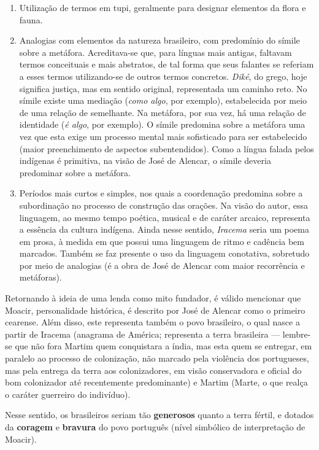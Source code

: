 \documentclass[12pt]{book}
\begin{document}
				\begin{enumerate}
					\item Utilização de termos em tupi, geralmente para designar elementos da flora e fauna.
					\item Analogias com elementos da natureza brasileiro, com predomínio do símile sobre a metáfora. Acreditava-se que, para línguas mais antigas, faltavam termos conceituais e mais abstratos, de tal forma que seus falantes se referiam a esses termos utilizando-se de outros termos concretos. \textit{Diké}, do grego, hoje significa justiça, mas em sentido original, representada um caminho reto. No símile existe uma mediação (\textit{como algo}, por exemplo), estabelecida por meio de uma relação de semelhante. Na metáfora, por sua vez, há uma relação de identidade (\textit{é algo}, por exemplo). O símile predomina sobre a metáfora uma vez que esta exige um processo mental mais sofisticado para ser estabelecido (maior preenchimento de aspectos subentendidos). Como a língua falada pelos indígenas é primitiva, na visão de José de Alencar, o símile deveria predominar sobre a metáfora.
					\item Períodos mais curtos e simples, nos quais a coordenação predomina sobre a subordinação no processo de construção das orações. Na visão do autor, essa linguagem, ao mesmo tempo poética, musical e de caráter arcaico, representa a essência da cultura indígena. Ainda nesse sentido, \textit{Iracema} seria um poema em prosa, à medida em que possui uma linguagem de ritmo e cadência bem marcados. Também se faz presente o uso da linguagem conotativa, sobretudo por meio de analogias (é a obra de José de Alencar com maior recorrência e metáforas).
				\end{enumerate}
				\par Retornando à ideia de uma lenda como mito fundador, é válido mencionar que Moacir, personalidade histórica, é descrito por José de Alencar como o primeiro cearense. Além disso, este representa também o povo brasileiro, o qual nasce a partir de Iracema (anagrama de América; representa a terra brasileira — lembre-se que não fora Martim quem conquistara a índia, mas esta quem se entregar, em paralelo ao processo de colonização, não marcado pela violência dos portugueses, mas pela entrega da terra aos colonizadores, em visão conservadora e oficial do bom colonizador até recentemente predominante) e Martim (Marte, o que realça o caráter guerreiro do indivíduo).
				\par Nesse sentido, os brasileiros seriam tão \textbf{generosos} quanto a terra fértil, e dotados da \textbf{coragem} e \textbf{bravura} do povo português (nível simbólico de interpretação de Moacir).
\end{document}
